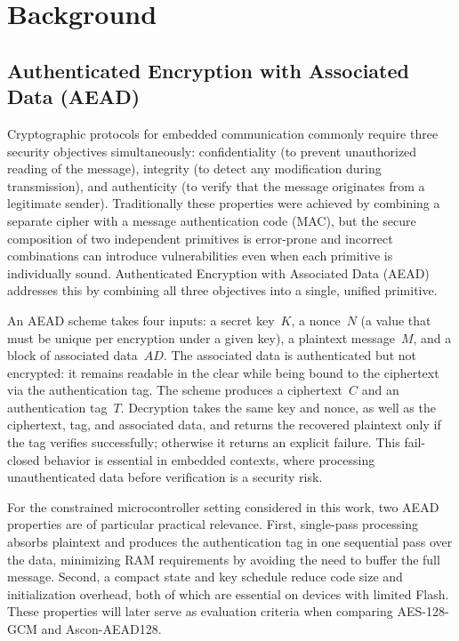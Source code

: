 \chapter{Background}

\section{Authenticated Encryption with Associated Data (AEAD)}

Cryptographic protocols for embedded communication commonly require three
security objectives simultaneously: confidentiality (to prevent unauthorized
reading of the message), integrity (to detect any modification during
transmission), and authenticity (to verify that the message originates from a
legitimate sender).
Traditionally these properties were achieved by combining a separate cipher with
a message authentication code (MAC), but the secure composition of two
independent primitives is error-prone and incorrect combinations can introduce
vulnerabilities even when each primitive is individually sound.
Authenticated Encryption with Associated Data (AEAD) addresses this by combining
all three objectives into a single, unified primitive.

An AEAD scheme takes four inputs: a secret key~$K$, a nonce~$N$ (a value that
must be unique per encryption under a given key), a plaintext message~$M$, and a
block of associated data~$AD$.
The associated data is authenticated but not encrypted: it remains readable in
the clear while being bound to the ciphertext via the authentication tag.
The scheme produces a ciphertext~$C$ and an authentication tag~$T$.
Decryption takes the same key and nonce, as well as the ciphertext, tag, and
associated data, and returns the recovered plaintext only if the tag verifies
successfully; otherwise it returns an explicit failure.
This fail-closed behavior is essential in embedded contexts, where processing
unauthenticated data before verification is a security risk.

For the constrained microcontroller setting considered in this work, two AEAD
properties are of particular practical relevance.
First, single-pass processing absorbs plaintext and produces the authentication
tag in one sequential pass over the data, minimizing RAM requirements by
avoiding the need to buffer the full message.
Second, a compact state and key schedule reduce code size and initialization
overhead, both of which are essential on devices with limited Flash.
These properties will later serve as evaluation criteria when comparing
AES-128-GCM and Ascon-AEAD128.

